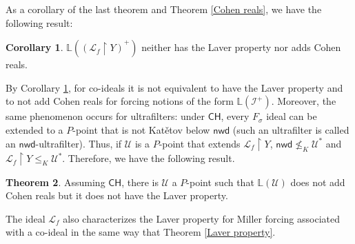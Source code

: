 \documentclass{amsart}
\theoremstyle{definition}
\newtheorem{theorem}{Theorem}[section]
\newtheorem{coro}[theorem]{Corollary}
\theoremstyle{remark}
\numberwithin{equation}{section}
\newcommand{\CH}{\mathsf{CH}}
\newcommand{\nwd}{\mathsf{nwd}}
\newcommand{\lf}{\mathcal{L}_f}
\newcommand{\lav}{\mathbb{L}}
\begin{document}
As a corollary of the last theorem and Theorem \ref{Cohen reals}, we have the following result:

\begin{coro}\label{diferent}
    $\lav((\lf\upharpoonright Y)^+)$ neither has the Laver property nor adds Cohen reals.
\end{coro}



By Corollary \ref{diferent}, for co-ideals it is not equivalent to have the Laver property and to not add Cohen reals for forcing notions of the form $\mathbb{L}(\mathcal{I}^+)$. Moreover, the same phenomenon occurs for ultrafilters: under $\CH$, every $F_\sigma$ ideal can be extended to a $P$-point that is not Kat\v{e}tov below $\nwd$ (such an ultrafilter is called an $\nwd$-ultrafilter). Thus, if $\mathcal{U}$ is a $P$-point that extends $\lf\upharpoonright Y$, $\nwd\nleq_K \mathcal{U}^*$ and $\lf\upharpoonright Y\leq_K \mathcal{U}^*$. Therefore, we have the following result.

\begin{theorem}
    Assuming $\CH$, there is $\mathcal{U}$ a $P$-point such that $\mathbb{L}(\mathcal{U})$ does not add Cohen reals but it does not have the Laver property.
\end{theorem}


The ideal $\lf$ also characterizes the Laver property for Miller forcing associated with a co-ideal in the same way that Theorem \ref{Laver property}. 
\end{document}
